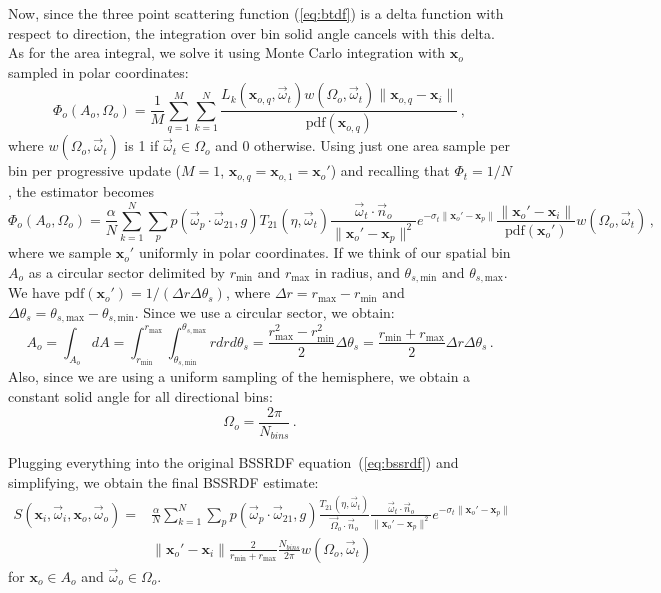 \documentclass[10pt,a4paper]{article}
\newcommand{\x}{\mathbf{x}}
\newcommand{\vomega}{\vec{\omega}}
\begin{document}
Now, since the three point scattering function (\ref{eq:btdf}) is a delta function with respect to direction, the integration over bin solid angle cancels with this delta. As for the area integral, we solve it using Monte Carlo integration with $\x_o$ sampled in polar coordinates:
%
\[
\Phi_o(A_o, \Omega_o) = \frac{1}{M} \sum_{q = 1}^M \sum_{k = 1}^N \frac{L_k(\x_{o,q}, \vomega_t) w(\Omega_o, \vomega_t) \|\x_{o,q} - \x_i\|}{\text{pdf}(\x_{o,q})} \, ,
\]
% 
where $w(\Omega_o, \vomega_t)$ is 1 if $\vomega_t \in \Omega_o$ and 0 otherwise. Using just one area sample per bin per progressive update ($M = 1$, $\x_{o,q} = \x_{o,1} = \x_o'$) and recalling that $\Phi_t = 1/N$, the estimator becomes
%
\[
\Phi_o(A_o, \Omega_o) = \frac{\alpha}{N} \sum_{k=1}^N\sum_p p(\vomega_p \cdot \vomega_{21}, g) T_{21}(\eta, \vomega_t)  \frac{\vomega_t \cdot \vec{n}_o}{\|\x_o' - \x_p\|^2}  e^{-\sigma_t \|\x_o' - \x_p\|} \frac{\|\x_o' - \x_i\|}{\text{pdf}(\x_o')} w(\Omega_o, \vomega_t) \, ,
\]
%
where we sample $\x_o'$ uniformly in polar coordinates. If we think of our spatial bin $A_o$ as a circular sector delimited by $r_\text{min}$ and $r_\text{max}$ in radius, and $\theta_{s,\text{min}}$ and $\theta_{s,\text{max}}$. We have $\text{pdf}(\x_o') = 1/(\Delta r \Delta \theta_{s})$, where $\Delta r =  r_\text{max} - r_\text{min}$ and $\Delta \theta_{s} = \theta_{s,\text{max}} - \theta_{s,\text{min}}$.  Since we use a circular sector, we obtain:
%
\[
A_o = \int_{A_o} dA = \int_{r_\text{min}}^{r_\text{max}}\int_{\theta_{s,\text{min}}}^{\theta_{s,\text{max}}} r dr d\theta_s =  \frac{r_\text{max}^2 - r_\text{min}^2}{2}  \Delta \theta_{s} = \frac{r_\text{min} + r_\text{max}}{2}  \Delta r \Delta \theta_{s} \, .
\]
%
Also, since we are using a uniform sampling of the hemisphere, we obtain a constant solid angle for all directional bins:
%
\begin{equation*}
\Omega_o = \frac{2\pi} {N_{bins}} \, .
\end{equation*}

Plugging everything into the original BSSRDF equation~(\ref{eq:bssrdf}) and simplifying, we obtain the final BSSRDF estimate:
%
\begin{equation*}
\begin{split}
S(\x_i, \vomega_i, \x_o, \vomega_o) = &\frac{\alpha}{N} \sum_{k=1}^N\sum_p p(\vomega_p \cdot \vomega_{21}, g)  \frac{ T_{21}(\eta, \vomega_t)}{\vec{\Omega}_o \cdot \vec{n}_o}  \frac{\vomega_t\cdot\vec{n}_o}{\|\x_o' - \x_p\|^2}  e^{-\sigma_t \|\x_o' - \x_p\|} \\& {\|\x_o' - \x_i\|} \frac{2}{r_\text{min} + r_\text{max}} \frac{N_{bins}}{2\pi} w(\Omega_o, \vomega_t)
\end{split}
\end{equation*}
%
for $\x_o \in A_o$ and $\vomega_o \in \Omega_o$.






\end{document}

